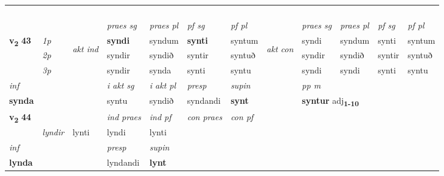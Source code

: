 \begin{longtable}[l]{X>{\footnotesize\itshape}llXXXXlXXXX}
\midrule
& \\*
  & \\*
   & \\*
  & \\
   \midrule
 & &   & \textit{praes sg}  & \textit{praes pl}    & \textit{ pf sg} & \textit{pf pl} & & \textit{praes sg}  & \textit{praes pl}    & \textit{pf sg} & \textit{pf pl }  \\ \cmidrule{4-7} \cmidrule{9-12}
 \multirow{2}{*}{{{\textbf{v{\textsubscript{2}}} \Large{\textbf{43}}}}}  & 1p & \multirow{3}{*}{\begin{turn}{90}\textit{akt ind}\end{turn}} & \textbf{syndi} & syndum & \textbf{synti} & syntum & \multirow{3}{*}{\begin{turn}{90}\textit{akt con}\end{turn}} &syndi & syndum & synti & syntum\\*
 & 2p &  &  syndir  & syndið & syntir & syntuð & & syndir & syndið & syntir & syntuð \\*
 & 3p &  & syndir & synda & synti & syntu & & syndi & syndi& synti & syntu \\*
\cmidrule{4-7} \cmidrule{9-12}

   {\textit{inf}} & &  & \textit{i akt sg} & \textit{i akt pl}   & \textit{presp} & \textit{supin}  && \textit{pp m} \\*
  {\textbf{synda}} & && syntu  & syndið   & syndandi &  \textbf{synt}  && \multicolumn{2}{l}{\textbf{syntur} adj\textbf{\textsubscript{1-10}}} \\*

\midrule

\multirow{2}{*}{{{\textbf{v{\textsubscript{2}}} \Large{\textbf{44}}}}}  &&&  \textit{ind praes} & \textit{ind pf} & \textit{con praes} & \textit{con pf} \\*
\multicolumn{3}{r}{\textit{e-m}} & lyndir & lynti & lyndi & lynti \\*

\cmidrule{4-7}
   {\textit{inf}} & &     & \textit{presp} & \textit{supin}   \\*
  {\textbf{lynda}} & &     & lyndandi &  \textbf{lynt}   \\*

\midrule


\end{longtable}
